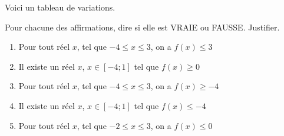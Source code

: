 Voici un tableau de variations.


Pour chacune des affirmations, dire si elle est VRAIE ou FAUSSE. Justifier.

\begin{enumerate}
\item Pour tout réel $x$, tel que $-4 \leq x \leq 3$, on a $f(x) \leq 3$
\item Il existe un réel $x$, $x \in [-4;1]$ tel que $f(x) \geq 0$
\item Pour tout réel $x$, tel que $-4 \leq x \leq 3$, on a $f(x) \geq -4$
\item Il existe un réel $x$, $x \in [-4;1]$ tel que $f(x) \leq -4$
\item Pour tout réel $x$, tel que $-2 \leq x \leq 3$, on a $f(x) \leq 0$ 
\end{enumerate}
